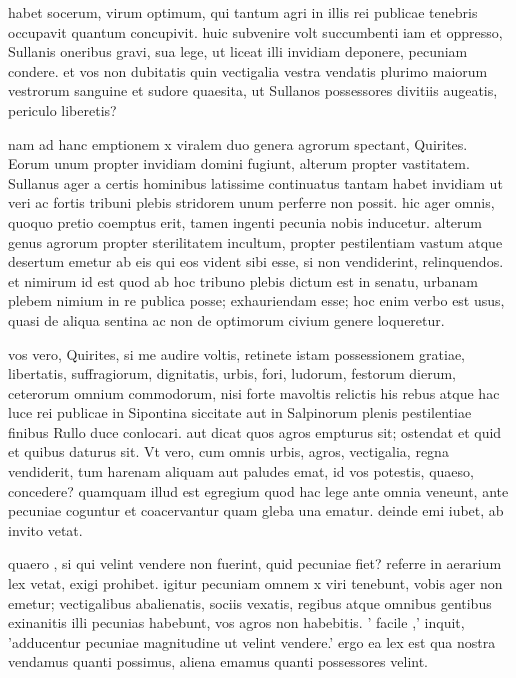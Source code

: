  habet socerum, virum optimum, qui tantum agri in illis rei publicae tenebris occupavit quantum concupivit. huic subvenire volt succumbenti iam et oppresso, Sullanis oneribus gravi, sua lege, ut liceat illi invidiam deponere, pecuniam condere. et vos non dubitatis quin vectigalia vestra vendatis plurimo maiorum vestrorum sanguine et sudore quaesita, ut Sullanos possessores divitiis augeatis, periculo liberetis?

 nam ad hanc emptionem x viralem duo genera agrorum spectant, Quirites. Eorum unum propter invidiam domini fugiunt, alterum propter vastitatem. Sullanus ager a certis hominibus latissime continuatus tantam habet invidiam ut veri ac fortis tribuni plebis stridorem unum perferre non possit. hic ager omnis, quoquo pretio coemptus erit, tamen ingenti pecunia nobis inducetur. alterum genus agrorum propter sterilitatem incultum, propter pestilentiam vastum atque desertum emetur ab eis qui eos vident sibi esse, si non vendiderint, relinquendos. et nimirum id est quod ab hoc tribuno plebis dictum est in senatu, urbanam plebem nimium in re publica posse; exhauriendam esse; hoc enim verbo est usus, quasi de aliqua sentina ac non de optimorum civium genere loqueretur.

 vos vero, Quirites, si me audire voltis, retinete istam possessionem gratiae, libertatis, suffragiorum, dignitatis, urbis, fori, ludorum, festorum dierum, ceterorum omnium commodorum, nisi forte mavoltis relictis his rebus atque hac luce rei publicae in Sipontina siccitate aut in Salpinorum plenis pestilentiae finibus Rullo duce conlocari. aut dicat quos agros empturus sit; ostendat et quid et quibus daturus sit. Vt vero, cum omnis urbis, agros, vectigalia, regna vendiderit, tum harenam aliquam aut paludes emat, id vos potestis, quaeso, concedere? quamquam illud est egregium quod hac lege ante omnia veneunt, ante pecuniae coguntur et coacervantur quam gleba una ematur. deinde emi iubet, ab invito vetat.

 quaero , si qui velint vendere non fuerint, quid pecuniae fiet? referre in aerarium lex vetat, exigi prohibet. igitur pecuniam omnem x viri tenebunt, vobis ager non emetur; vectigalibus abalienatis, sociis vexatis, regibus atque omnibus gentibus exinanitis illi pecunias habebunt, vos agros non habebitis. ' facile ,' inquit, 'adducentur pecuniae magnitudine ut velint vendere.' ergo ea lex est qua nostra vendamus quanti possimus, aliena emamus quanti possessores velint.


